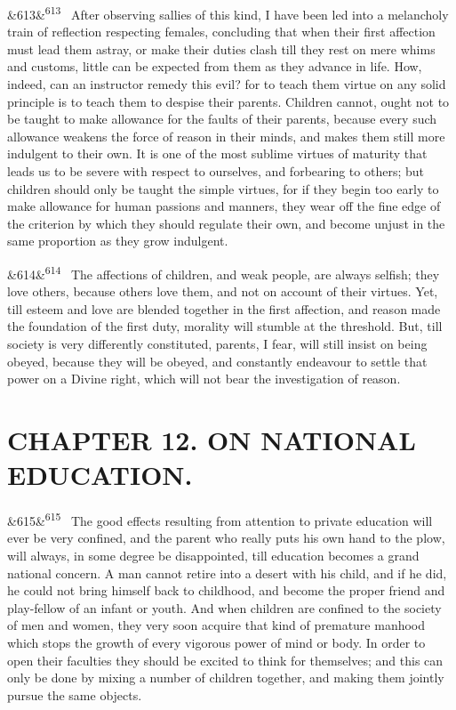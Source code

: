 \documentclass[12pt]{article}
\newcommand{\para}[1][]{\par\noindent\ifx&#1&\else\textsuperscript{\footnotesize #1}~\fi}
\begin{document}
\para[613] After observing sallies of this kind, I have been led into a melancholy train of reflection respecting females, concluding that when their first affection must lead them astray, or make their duties clash till they rest on mere whims and customs, little can be expected from them as they advance in life. How, indeed, can an instructor remedy this evil? for to teach them virtue on any solid principle is to teach them to despise their parents. Children cannot, ought not to be taught to make allowance for the faults of their parents, because every such allowance weakens the force of reason in their minds, and makes them still more indulgent to their own. It is one of the most sublime virtues of maturity that leads us to be severe with respect to ourselves, and forbearing to others; but children should only be taught the simple virtues, for if they begin too early to make allowance for human passions and manners, they wear off the fine edge of the criterion by which they should regulate their own, and become unjust in the same proportion as they grow indulgent.

\para[614] The affections of children, and weak people, are always selfish; they love others, because others love them, and not on account of their virtues. Yet, till esteem and love are blended together in the first affection, and reason made the foundation of the first duty, morality will stumble at the threshold. But, till society is very differently constituted, parents, I fear, will still insist on being obeyed, because they will be obeyed, and constantly endeavour to settle that power on a Divine right, which will not bear the investigation of reason.

\section*{CHAPTER 12. ON NATIONAL EDUCATION.}

\para[615] The good effects resulting from attention to private education will ever be very confined, and the parent who really puts his own hand to the plow, will always, in some degree be disappointed, till education becomes a grand national concern. A man cannot retire into a desert with his child, and if he did, he could not bring himself back to childhood, and become the proper friend and play-fellow of an infant or youth. And when children are confined to the society of men and women, they very soon acquire that kind of premature manhood which stops the growth of every vigorous power of mind or body. In order to open their faculties they should be excited to think for themselves; and this can only be done by mixing a number of children together, and making them jointly pursue the same objects.
\end{document}
